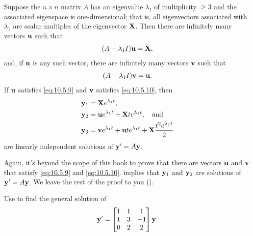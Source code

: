 \begin{theorem}\label{thmtype:10.5.2}
Suppose the $n\times n$ matrix $A$ has an eigenvalue $\lambda_1$ of
multiplicity $\ge 3$ and the associated eigenspace is
one-dimensional; that is, all eigenvectors associated with
$\lambda_1$
are scalar multiples of the eigenvector $\mathbf{X}$. Then there are
infinitely many vectors $\mathbf{u}$ such that
\begin{equation}\label{eq:10.5.9}
(A-\lambda_1I)\mathbf{u}=\mathbf{X},
\end{equation}
and, if $\mathbf{u}$ is any such vector,  there are infinitely many
vectors $\mathbf{v}$ such that
\begin{equation}\label{eq:10.5.10}
(A-\lambda_1I)\mathbf{v}=\mathbf{u}.
\end{equation}
 If $\mathbf{u}$ satisfies \eqref{eq:10.5.9}  and $\mathbf{v}$ satisfies
\eqref{eq:10.5.10},  then
\begin{align*}
\mathbf{y}_1&=\mathbf{X} e^{\lambda_1t},\\
\mathbf{y}_2&=\mathbf{u}e^{\lambda_1t}+\mathbf{X} te^{\lambda_1t},\quad\text{and}\\
\mathbf{y}_3&=\mathbf{v}e^{\lambda_1t}+\mathbf{u}te^{\lambda_1t}
+\mathbf{X} \frac{t^2e^{\lambda_1t}}{2}
\end{align*}
are linearly independent solutions of  $\mathbf{y}'=A\mathbf{y}$.
\end{theorem}

Again, it's beyond the scope of this book to prove that there are
vectors $\mathbf{u}$ and $\mathbf{v}$ that satisfy \eqref{eq:10.5.9} and
\eqref{eq:10.5.10}.  implies that $\mathbf{y}_1$ and
$\mathbf{y}_2$ are solutions of $\mathbf{y}'=A\mathbf{y}$. We leave the rest of
the proof to you ().

\begin{example}\label{example:10.5.4}
Use  to find the general solution of
\begin{equation}\label{eq:10.5.11}
\mathbf{y}'=\begin{bmatrix}1&1&1\\1&3&-1\\0&2&2\end{bmatrix}\mathbf{y}.
\end{equation}
\end{example}

